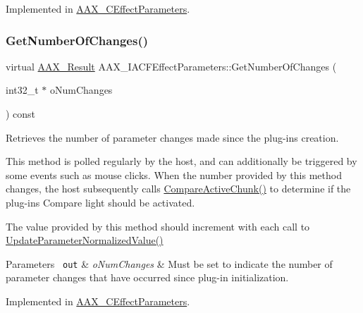 Implemented in \mbox{\hyperlink{a01481_a514644d855be6f58043ec165f6ce8ddb}{A\+A\+X\+\_\+\+C\+Effect\+Parameters}}.

\mbox{\label{a01669_a17b96da201d9a242d3662e87525a7227}} 
\subsubsection{\texorpdfstring{GetNumberOfChanges()}{GetNumberOfChanges()}}
{\footnotesize\ttfamily virtual \mbox{\hyperlink{a00392_a4d8f69a697df7f70c3a8e9b8ee130d2f}{A\+A\+X\+\_\+\+Result}} A\+A\+X\+\_\+\+I\+A\+C\+F\+Effect\+Parameters\+::\+Get\+Number\+Of\+Changes (\begin{DoxyParamCaption}\item[{int32\+\_\+t $\ast$}]{o\+Num\+Changes }\end{DoxyParamCaption}) const\hspace{0.3cm}{\ttfamily [pure virtual]}}



Retrieves the number of parameter changes made since the plug-\/in\textquotesingle{}s creation. 

This method is polled regularly by the host, and can additionally be triggered by some events such as mouse clicks. When the number provided by this method changes, the host subsequently calls \mbox{\hyperlink{a01669_a1e86f849e970c9998313fc7d451ccf85}{Compare\+Active\+Chunk()}} to determine if the plug-\/in\textquotesingle{}s Compare light should be activated.

The value provided by this method should increment with each call to \mbox{\hyperlink{a01669_a685858711efb8634ce66c327f2865c71}{Update\+Parameter\+Normalized\+Value()}}


\begin{DoxyParams}[1]{Parameters}
\mbox{\texttt{ out}}  & {\em o\+Num\+Changes} & Must be set to indicate the number of parameter changes that have occurred since plug-\/in initialization. \\
\hline
\end{DoxyParams}


Implemented in \mbox{\hyperlink{a01481_a9c6e26d6b3e028fcb048e01caa155f65}{A\+A\+X\+\_\+\+C\+Effect\+Parameters}}.

\mbox{\label{a01669_ab5b8da9e1a9d778d327ac04f4ab8d139}} 
